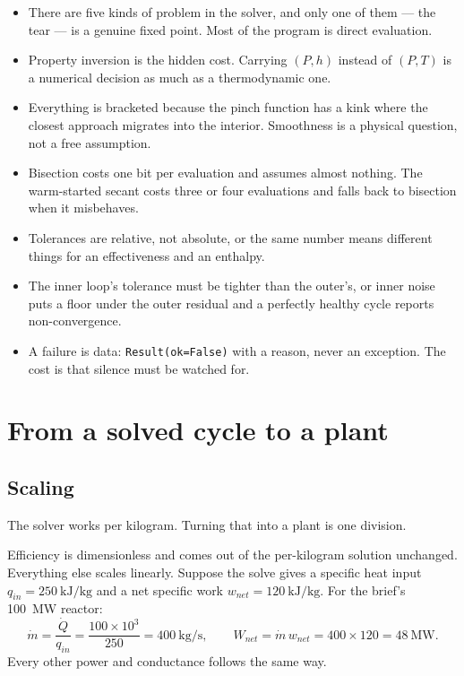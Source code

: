 \documentclass[11pt,a4paper]{report}
\newcommand{\code}[1]{\texttt{\small #1}}
\begin{document}
\begin{itemize}\itemsep2pt
\item There are five kinds of problem in the solver, and only one of them
      --- the tear --- is a genuine fixed point. Most of the program is
      direct evaluation.
\item Property inversion is the hidden cost. Carrying $(P,h)$ instead of
      $(P,T)$ is a numerical decision as much as a thermodynamic one.
\item Everything is bracketed because the pinch function has a kink where
      the closest approach migrates into the interior. Smoothness is a
      physical question, not a free assumption.
\item Bisection costs one bit per evaluation and assumes almost nothing.
      The warm-started secant costs three or four evaluations and falls
      back to bisection when it misbehaves.
\item Tolerances are relative, not absolute, or the same number means
      different things for an effectiveness and an enthalpy.
\item The inner loop's tolerance must be tighter than the outer's, or
      inner noise puts a floor under the outer residual and a perfectly
      healthy cycle reports non-convergence.
\item A failure is data: \code{Result(ok=False)} with a reason, never an
      exception. The cost is that silence must be watched for.
\end{itemize}

\chapter{From a solved cycle to a plant}
\label{ch:sizing}

\section{Scaling}

The solver works per kilogram. Turning that into a plant is one division.

Efficiency is dimensionless and comes out of the per-kilogram solution
unchanged. Everything else scales linearly. Suppose the solve gives a
specific heat input $q_{in} = \SI{250}{\kilo\joule\per\kilogram}$ and a net
specific work $w_{net} = \SI{120}{\kilo\joule\per\kilogram}$. For the
brief's \SI{100}{\mega\watt} reactor:
\[
  \dot m = \frac{\dot Q}{q_{in}}
         = \frac{100 \times 10^3}{250}
         = \SI{400}{\kilogram\per\second},
  \qquad
  W_{net} = \dot m\, w_{net}
          = 400 \times 120 = \SI{48}{\mega\watt}.
\]
Every other power and conductance follows the same way.
\end{document}
